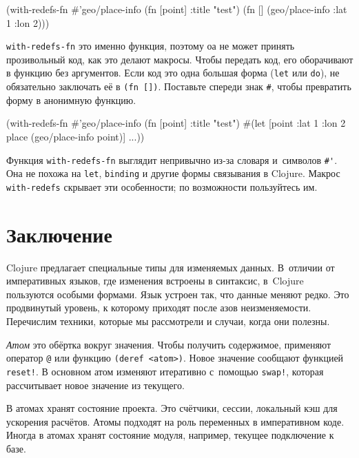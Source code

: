 \begin{english}
  \begin{clojure}
(with-redefs-fn
  {#'geo/place-info (fn [point] {:title "test"})}
  (fn []
    (geo/place-info {:lat 1 :lon 2})))
  \end{clojure}
\end{english}


\verb|with-redefs-fn| это именно функция, поэтому оа не может принять
прозивольный код, как это делают макросы. Чтобы передать код, его оборачивают в
функцию без аргументов. Если код это одна большая форма (\verb|let| или
\verb|do|), не обязательно заключать её в \verb|(fn [])|. Поставьте спереди
знак \verb|#|, чтобы превратить форму в анонимную функцию.

\begin{english}
  \begin{clojure}
(with-redefs-fn
  {#'geo/place-info (fn [point] {:title "test"})}
  #(let [point {:lat 1 :lon 2}
         place (geo/place-info point)]
     ...))
  \end{clojure}
\end{english}

Функция \verb|with-redefs-fn| выглядит непривычно из-за словаря и~символов
\verb|#'|. Она не похожа на \verb|let|, \verb|binding| и другие формы
связывания в Clojure. Макрос \verb|with-redefs| скрывает эти особенности; по
возможности пользуйтесь им.

\section{Заключение}

Clojure предлагает специальные типы для изменяемых данных. В~отличии от
императивных языков, где изменения встроены в синтаксис, в~Clojure пользуются
особыми формами. Язык устроен так, что данные меняют редко. Это продвинутый
уровень, к которому приходят после азов неизменяемости. Перечислим техники,
которые мы рассмотрели и случаи, когда они полезны.

\emph{Атом} это обёртка вокруг значения. Чтобы получить содержимое,
применяют оператор \verb|@| или функцию \verb|(deref <atom>)|. Новое
значение сообщают функцией \verb|reset!|. В основном атом изменяют итеративно
с~помощью \verb|swap!|, которая рассчитывает новое значение из текущего.

В атомах хранят состояние проекта. Это счётчики, сессии, локальный кэш
для ускорения расчётов. Атомы подходят на роль переменных в императивном
коде. Иногда в атомах хранят состояние модуля, например, текущее подключение к
базе.

